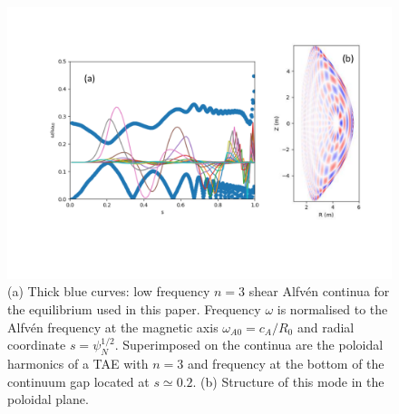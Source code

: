 \documentclass[10pt, a4paper, twoside]{article}
\begin{document}
\begin{figure}[htpb]
    \centering
    \vspace{-1.7cm}
    \includegraphics[width=1.0\linewidth]{Figures/TAE_figure1.pdf}
    \vspace{-3cm}
    \caption{(a) Thick blue curves: low frequency $n=3$ shear Alfv\'en continua for the equilibrium used in this paper. Frequency $\omega$ is normalised to the Alfv\'en frequency at the magnetic axis $\omega_{A0} = c_A/R_0$ and radial coordinate $s = \psi_N^{1/2}$. Superimposed on the continua are the poloidal harmonics of a TAE with $n=3$ and frequency at the bottom of the continuum gap located at $s \simeq 0.2$. (b) Structure of this mode in the poloidal plane.}
    \label{fig:TAE_structure}
\end{figure}
\end{document}
